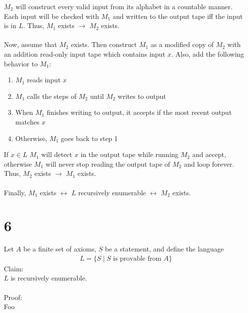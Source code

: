 \documentclass[letterpaper,notitlepage,twoside]{article}
\begin{document}
$M_2$ will construct every valid input from its alphabet in a countable manner. Each input will be checked with $M_1$ and written to the output tape iff the input is in $L$. Thus, $M_1$ exists $\rightarrow$ $M_2$ exists.
\\
\\
Now, assume that $M_2$ exists. Then construct $M_1$ as a modified copy of $M_2$ with an addition read-only input tape which contains input $x$. Also, add the following behavior to $M_1$:
\begin{enumerate}
\item $M_1$ reads input $x$
\item $M_1$ calls the steps of $M_2$ until $M_2$ writes to output
\item When $M_1$ finishes writing to output, it accepts if the most recent output matches $x$
\item Otherwise, $M_1$ goes back to step 1
\end{enumerate}
If $x \in L$ $M_1$ will detect $x$ in the output tape while running $M_2$ and accept, otherwise $M_1$ will never stop reading the output tape of $M_2$ and loop forever. Thus, $M_2$ exists $\rightarrow$ $M_1$ exists.
\\
\\
Finally, $M_1$ exists $\leftrightarrow$ $L$ recursively enumerable $\leftrightarrow$ $M_2$ exists.

\section*{6}
Let $A$ be a finite set of axioms, $S$ be a statement, and define the language
\begin{align*}
L = \lbrace S \mid S \text{ is provable from } A \rbrace
\end{align*}
Claim:
\\
$L$ is recursively enumerable.
\\
\\
Proof:
\\
Foo
\end{document}
